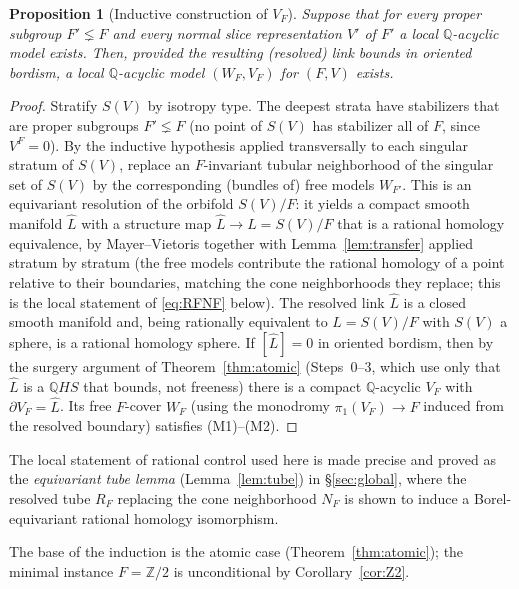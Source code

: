 \documentclass[12pt]{article}
\newtheorem{proposition}[theorem]{Proposition}
\theoremstyle{definition}
\begin{document}
\begin{proposition}[Inductive construction of $V_F$]\label{prop:induct}
Suppose that for every proper subgroup $F'\lneq F$ and every normal slice
representation $V'$ of $F'$ a local $\mathbb{Q}$-acyclic model exists.
Then, provided the resulting (resolved) link bounds in oriented bordism, a
local $\mathbb{Q}$-acyclic model $(W_F,V_F)$ for $(F,V)$ exists.
\end{proposition}
\begin{proof}
Stratify $S(V)$ by isotropy type. The deepest strata have stabilizers that are
proper subgroups $F'\lneq F$ (no point of $S(V)$ has stabilizer all of $F$,
since $V^F=0$). By the inductive hypothesis applied transversally to each
singular stratum of $S(V)$, replace an $F$-invariant tubular neighborhood of the
singular set of $S(V)$ by the corresponding (bundles of) free models $W_{F'}$.
This is an equivariant resolution of the orbifold $S(V)/F$: it yields a compact
smooth manifold $\widehat L$ with a structure map $\widehat L\to L=S(V)/F$ that
is a rational homology equivalence, by Mayer--Vietoris together with
Lemma~\ref{lem:transfer} applied stratum by stratum (the free models contribute
the rational homology of a point relative to their boundaries, matching the
cone neighborhoods they replace; this is the local statement of
\eqref{eq:RFNF} below). The resolved link $\widehat L$ is a closed smooth
manifold and, being rationally equivalent to $L=S(V)/F$ with $S(V)$ a sphere, is
a rational homology sphere. If $[\widehat L]=0$ in oriented bordism, then by the
surgery argument of Theorem~\ref{thm:atomic} (Steps~0--3, which use only that
$\widehat L$ is a $\mathbb{Q}HS$ that bounds, not freeness) there is a compact
$\mathbb{Q}$-acyclic $V_F$ with $\partial V_F=\widehat L$. Its free
$F$-cover $W_F$ (using the monodromy $\pi_1(V_F)\to F$ induced from the resolved
boundary) satisfies (M1)--(M2).
\end{proof}

The local statement of rational control used here is made precise and proved as
the \emph{equivariant tube lemma} (Lemma~\ref{lem:tube}) in
\S\ref{sec:global}, where the resolved tube $R_F$ replacing the cone
neighborhood $N_F$ is shown to induce a Borel-equivariant rational homology
isomorphism.

The base of the induction is the atomic case (Theorem~\ref{thm:atomic}); the
minimal instance $F=\mathbb{Z}/2$ is unconditional by Corollary~\ref{cor:Z2}.
\end{document}
